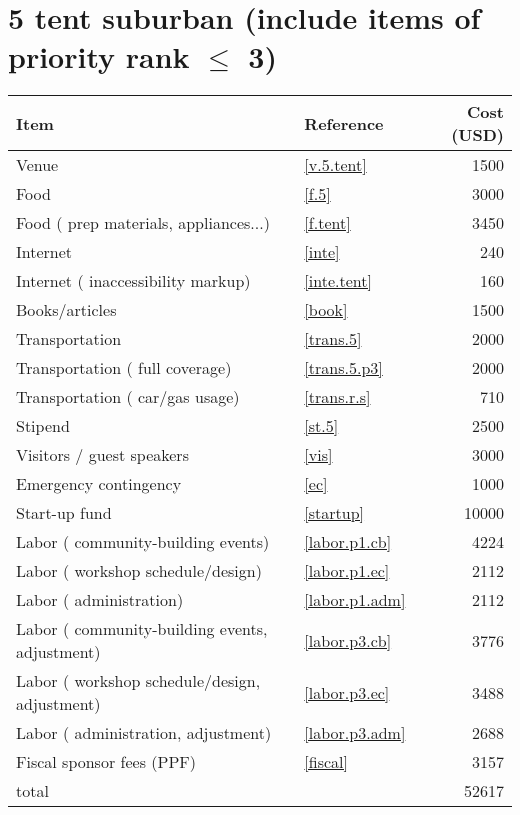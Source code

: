 \section*{5 tent suburban (include items of priority rank $\leq$ 3)}
\begin{center}
\begin{tabular}{llr}
Item & Reference & Cost (USD) \\ \hline
Venue & \ref{v.5.tent} & 1500 \\
Food & \ref{f.5} & 3000 \\
Food ( prep materials, appliances...) & \ref{f.tent} & 3450 \\
Internet & \ref{inte} & 240 \\
Internet ( inaccessibility markup) & \ref{inte.tent} & 160 \\
Books/articles & \ref{book} & 1500 \\
Transportation & \ref{trans.5} & 2000 \\
Transportation ( full coverage) & \ref{trans.5.p3} & 2000 \\
Transportation ( car/gas usage) & \ref{trans.r.s} & 710 \\
Stipend & \ref{st.5} & 2500 \\
Visitors / guest speakers & \ref{vis} & 3000 \\
Emergency contingency & \ref{ec} & 1000 \\
Start-up fund & \ref{startup} & 10000 \\
Labor ( community-building events) & \ref{labor.p1.cb} & 4224 \\
Labor ( workshop schedule/design) & \ref{labor.p1.ec} & 2112 \\
Labor ( administration) & \ref{labor.p1.adm} & 2112 \\
Labor ( community-building events, adjustment) & \ref{labor.p3.cb} & 3776 \\
Labor ( workshop schedule/design, adjustment) & \ref{labor.p3.ec} & 3488 \\
Labor ( administration, adjustment) & \ref{labor.p3.adm} & 2688 \\
Fiscal sponsor fees (PPF) & \ref{fiscal} & 3157 \\ \hline
total &  & 52617
\end{tabular}
\end{center}
\newpage
